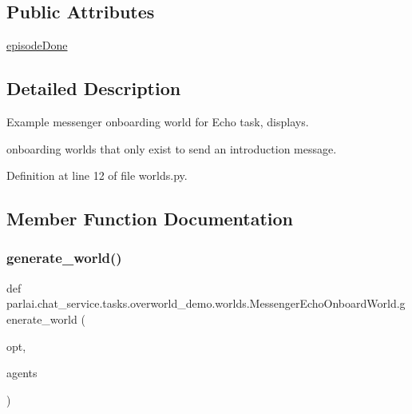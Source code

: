 \subsection*{Public Attributes}
\begin{DoxyCompactItemize}
\item 
\hyperlink{classparlai_1_1chat__service_1_1tasks_1_1overworld__demo_1_1worlds_1_1MessengerEchoOnboardWorld_a3a751645ae8e2548ef8de953e9905433}{episode\+Done}
\end{DoxyCompactItemize}


\subsection{Detailed Description}
\begin{DoxyVerb}Example messenger onboarding world for Echo task, displays.

onboarding worlds that only exist to send an introduction message.
\end{DoxyVerb}
 

Definition at line 12 of file worlds.\+py.



\subsection{Member Function Documentation}
\mbox{\label{classparlai_1_1chat__service_1_1tasks_1_1overworld__demo_1_1worlds_1_1MessengerEchoOnboardWorld_ab579e33ffbc640197255282f56f6fed8}} 
\subsubsection{\texorpdfstring{generate\+\_\+world()}{generate\_world()}}
{\footnotesize\ttfamily def parlai.\+chat\+\_\+service.\+tasks.\+overworld\+\_\+demo.\+worlds.\+Messenger\+Echo\+Onboard\+World.\+generate\+\_\+world (\begin{DoxyParamCaption}\item[{}]{opt,  }\item[{}]{agents }\end{DoxyParamCaption})\hspace{0.3cm}{\ttfamily [static]}}




